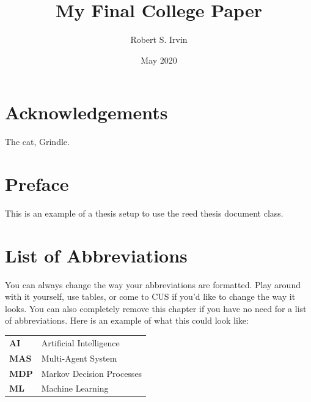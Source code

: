 \documentclass[12pt,twoside]{reedthesis}
\title{My Final College Paper}
\author{Robert S. Irvin}
\date{May 2020}
\begin{document}
  \maketitle
  \frontmatter %
  \pagestyle{empty} %

    \chapter*{Acknowledgements}
	The cat, Grindle.

    \chapter*{Preface}
	This is an example of a thesis setup to use the reed thesis document class.
	
	

    \chapter*{List of Abbreviations}
		You can always change the way your abbreviations are formatted. Play around with it yourself, use tables, or come to CUS if you'd like to change the way it looks. You can also completely remove this chapter if you have no need for a list of abbreviations. Here is an example of what this could look like:

	\begin{table}[h]
	\centering %
	\begin{tabular}{ll}
		\textbf{AI}  	&  Artificial Intelligence\\
		\textbf{MAS}  	&  Multi-Agent System\\
		\textbf{MDP}    &  Markov Decision Processes\\
		\textbf{ML}     &  Machine Learning\\
	\end{tabular}
	\end{table}
	

    \tableofcontents
    \listoftables
    \listoffigures

\end{document}

